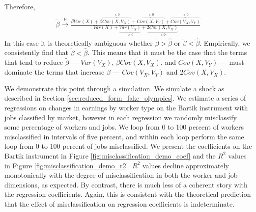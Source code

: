 \documentclass[12pt]{article}
\theoremstyle{definition}
\theoremstyle{plain}
\begin{document}
Therefore,
\begin{align*}
	\tilde\beta \overset{p}{\rightarrow} \frac{\beta Var(X) + \beta \overset{<0}{\overbrace{Cov(X,V_X)}} + \overset{<0}{\overbrace{Cov(X,V_Y)}} + \overset{>0}{\overbrace{Cov(V_X,V_Y)}}}{Var(X) + \underset{>0}{\underbrace{Var(V_X)}} + \underset{<0}{\underbrace{2Cov(X,V_X)}}}
\end{align*}
In this case it is theoretically ambiguous whether $\tilde\beta>\hat\beta$ or $\tilde\beta<\hat\beta$. Empirically, we consistently find that $\tilde\beta<\hat\beta$. This means that it must be the case that the terms that tend to reduce $\tilde\beta$ --- $Var(V_X)$, $\beta Cov(X,V_X)$, and $Cov(X,V_Y)$ --- must dominate the terms that increase $\tilde\beta$ --- $Cov(V_X,V_Y)$ and $2 Cov(X,V_X)$. 


We demonstrate this point through a simulation. We simulate a shock as described in Section \ref{sec:reduced_form_fake_olympics}. We estimate a series of regressions on changes in earnings by worker type on the Bartik instrument with jobs classified by market, however in each regression we randomly misclassify some percentage of workers and jobs. We loop from 0 to 100 percent of workers misclassified in intervals of five percent, and within each loop perform the same loop from 0 to 100 percent of jobs misclassified. We present the coefficients on the Bartik instrument in Figure \ref{fig:misclassification_demo_coef} and the $R^2$ values in Figure \ref{fig:misclassification_demo_r2}. $R^2$ values decline approximately monotonically with the degree of misclassification in both the worker and job dimensions, as expected. By contrast, there is much less of a coherent story with the regression coefficients. Again, this is consistent with the theoretical prediction that the effect of misclassification on regression coefficients is indeterminate.
\end{document}
